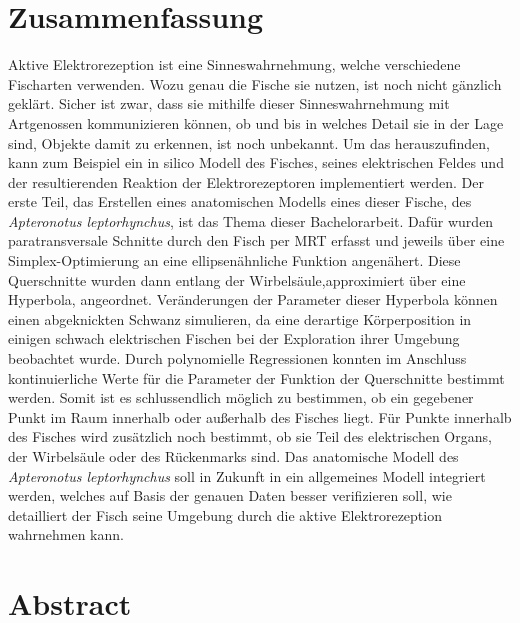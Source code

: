 \documentclass[twoside,12pt,a4paper]{report}
\begin{document}
\section*{Zusammenfassung}
Aktive Elektrorezeption ist eine Sinneswahrnehmung, welche verschiedene Fischarten verwenden. Wozu genau die Fische sie nutzen, ist noch nicht gänzlich geklärt. Sicher ist zwar, dass sie mithilfe dieser Sinneswahrnehmung mit Artgenossen kommunizieren können, ob und bis in welches Detail sie in der Lage sind, Objekte damit zu erkennen, ist noch unbekannt. Um das herauszufinden, kann zum Beispiel ein in silico Modell des Fisches, seines elektrischen Feldes und der resultierenden Reaktion der Elektrorezeptoren implementiert werden. Der erste Teil, das Erstellen eines anatomischen Modells eines dieser Fische, des \textit{Apteronotus leptorhynchus}, ist das Thema dieser Bachelorarbeit. Dafür wurden paratransversale Schnitte durch den Fisch per MRT erfasst und jeweils über eine Simplex-Optimierung an eine ellipsenähnliche Funktion angenähert. Diese Querschnitte wurden dann entlang der Wirbelsäule,approximiert über eine Hyperbola, angeordnet. Veränderungen der Parameter dieser Hyperbola können einen abgeknickten Schwanz simulieren, da eine derartige Körperposition in einigen schwach elektrischen Fischen bei der Exploration ihrer Umgebung beobachtet wurde. Durch polynomielle Regressionen konnten im Anschluss kontinuierliche Werte für die Parameter der Funktion der Querschnitte bestimmt werden. Somit ist es schlussendlich möglich zu bestimmen, ob ein gegebener Punkt im Raum innerhalb oder außerhalb des Fisches liegt. Für Punkte innerhalb des Fisches wird zusätzlich noch bestimmt, ob sie Teil des elektrischen Organs, der Wirbelsäule oder des Rückenmarks sind. Das anatomische Modell des \textit{Apteronotus leptorhynchus} soll in Zukunft in ein allgemeines Modell integriert werden, welches auf Basis der genauen Daten besser verifizieren soll, wie detailliert der Fisch seine Umgebung durch die aktive Elektrorezeption wahrnehmen kann. 
\newpage

\section*{Abstract}
\end{document}
